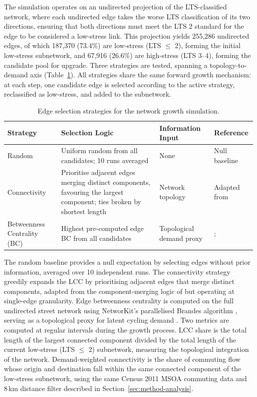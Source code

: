 The simulation operates on an undirected projection of the LTS-classified
network, where each undirected edge takes the worse LTS classification of its
two directions, ensuring that both directions must meet the LTS 2 standard for
the edge to be considered a low-stress link. This projection yields 255,286
undirected edges, of which 187,370 (73.4\%) are low-stress (LTS $\leq$ 2),
forming the initial low-stress subnetwork, and 67,916 (26.6\%) are high-stress
(LTS 3--4), forming the candidate pool for upgrade. Three strategies are tested,
spanning a topology-to-demand axis (Table~\ref{tab:strategies}). All strategies
share the same forward growth mechanism: at each step, one candidate edge is
selected according to the active strategy, reclassified as low-stress, and
added to the subnetwork.

\begin{table}[htbp]
  \centering
  \caption{Edge selection strategies for the network growth simulation.}
  \label{tab:strategies}
  \begin{tabularx}{\textwidth}{@{}p{2.1cm} >{\RaggedRight\arraybackslash}X p{2.3cm} p{2.7cm}@{}}
    \toprule
    Strategy & Selection Logic & Information Input & Reference \\
    \midrule
    Random
      & Uniform random from all candidates; 10 runs averaged
      & None
      & Null baseline \\[4pt]
    Connectivity
      & Prioritise adjacent edges merging distinct components, favouring the
        largest component; ties broken by shortest length
      & Network topology
      & Adapted from \textcite{nateraorozco2020} \\[4pt]
    Betweenness Centrality (BC)
      & Highest pre-computed edge BC from all candidates
      & Topological demand proxy
      & \textcite{szell2022}; \textcite{steinacker2022} \\
    \bottomrule
  \end{tabularx}
\end{table}

The random baseline provides a null expectation by selecting edges without
prior information, averaged over 10 independent runs. The connectivity strategy
greedily expands the LCC by prioritising adjacent edges that merge distinct
components, adapted from the component-merging logic of \textcite{nateraorozco2020}
but operating at single-edge granularity. Edge betweenness centrality is
computed on the full undirected street network using NetworKit's parallelised
Brandes algorithm \parencite{staudt2016}, serving as a topological proxy for
latent cycling demand \parencite{mccahill2008,kirkley2018,szell2022}. Two
metrics are computed at regular intervals during the growth process. LCC share
is the total length of the largest connected component divided by the total
length of the current low-stress (LTS $\leq$ 2) subnetwork, measuring the
topological integration of the network. Demand-weighted connectivity is the
share of commuting flow whose origin and destination fall within the same
connected component of the low-stress subnetwork, using the same Census 2011
MSOA commuting data and 8\,km distance filter described in Section~\ref{sec:method-analysis}.
